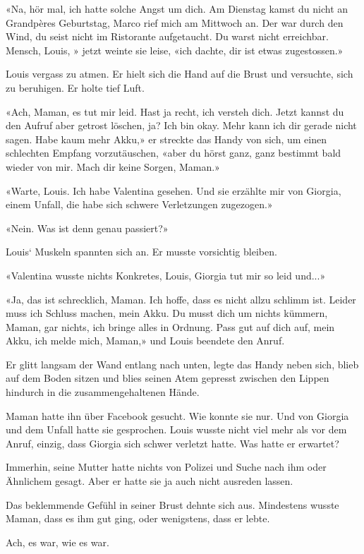 «Na, hör mal, ich hatte solche Angst um dich. Am Dienstag kamst du nicht
an Grandpères Geburtstag, Marco rief mich am Mittwoch an. Der war durch
den Wind, du seist nicht im Ristorante aufgetaucht. Du warst nicht
erreichbar. Mensch, Louis, » jetzt weinte sie leise, «ich dachte, dir
ist etwas zugestossen.»

Louis vergass zu atmen. Er hielt sich die Hand auf die Brust und
versuchte, sich zu beruhigen. Er holte tief Luft.

«Ach, Maman, es tut mir leid. Hast ja recht, ich versteh dich. Jetzt
kannst du den Aufruf aber getrost löschen, ja? Ich bin okay. Mehr kann
ich dir gerade nicht sagen. Habe kaum mehr Akku,» er streckte das Handy
von sich, um einen schlechten Empfang vorzutäuschen, «aber du hörst
ganz, ganz bestimmt bald wieder von mir. Mach dir keine Sorgen, Maman.»

«Warte, Louis. Ich habe Valentina gesehen. Und sie erzählte mir von
Giorgia, einem Unfall, die habe sich schwere Verletzungen zugezogen.»

«Nein. Was ist denn genau passiert?»

Louis` Muskeln spannten sich an. Er musste vorsichtig bleiben.

«Valentina wusste nichts Konkretes, Louis, Giorgia tut mir so leid
und...»

«Ja, das ist schrecklich, Maman. Ich hoffe, dass es nicht allzu schlimm
ist. Leider muss ich Schluss machen, mein Akku. Du musst dich um nichts
kümmern, Maman, gar nichts, ich bringe alles in Ordnung. Pass gut auf
dich auf, mein Akku, ich melde mich, Maman,» und Louis beendete den
Anruf.

Er glitt langsam der Wand entlang nach unten, legte das Handy neben
sich, blieb auf dem Boden sitzen und blies seinen Atem gepresst zwischen
den Lippen hindurch in die zusammengehaltenen Hände.

Maman hatte ihn über Facebook gesucht. Wie konnte sie nur. Und von
Giorgia und dem Unfall hatte sie gesprochen. Louis wusste nicht viel
mehr als vor dem Anruf, einzig, dass Giorgia sich schwer verletzt hatte.
Was hatte er erwartet?

Immerhin, seine Mutter hatte nichts von Polizei und Suche nach ihm oder
Ähnlichem gesagt. Aber er hatte sie ja auch nicht ausreden lassen.

Das beklemmende Gefühl in seiner Brust dehnte sich aus. Mindestens
wusste Maman, dass es ihm gut ging, oder wenigstens, dass er lebte.

Ach, es war, wie es war.

